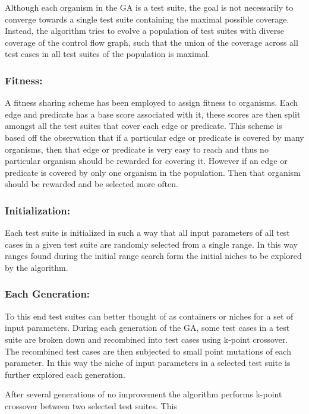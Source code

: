 \documentclass[runningheads]{llncs}
\begin{document}
Although each organism in the GA is a test suite, the goal is not necessarily to converge towards a single test suite containing the maximal possible coverage. Instead, the algorithm tries to evolve a population of test suites with diverse coverage of the control flow graph, such that the union of the coverage across all test cases in all test suites of the population is maximal. 

\subsubsection{Fitness:}
A fitness sharing scheme has been employed to assign fitness to organisms. Each edge and predicate has a base score associated with it, these scores are then split amongst all the test suites that cover each edge or predicate. This scheme is based off the observation that if a particular edge or predicate is covered by many organisms, then that edge or predicate is very easy to reach and thus no particular organism should be rewarded for covering it. However if an edge or predicate is covered by only one organism in the population. Then that organism should be rewarded and be selected more often. 

\subsubsection{Initialization:}
Each test suite is initialized in such a way that all input parameters of all test cases in a given test suite are randomly selected from a single range. In this way ranges found during the initial range search form the initial niches to be explored by the algorithm. 


\subsubsection{Each Generation:}

To this end test suites can better thought of as containers or niches for a set of input parameters. During each generation of the GA, some test cases in a test suite are broken down and recombined into test cases using k-point crossover. The recombined test cases are then subjected to small point mutations of each parameter. In this way the niche of input parameters in a selected test suite is further explored each generation.

After several generations of no improvement the algorithm performs k-point crossover between two selected test suites. This 
\end{document}
